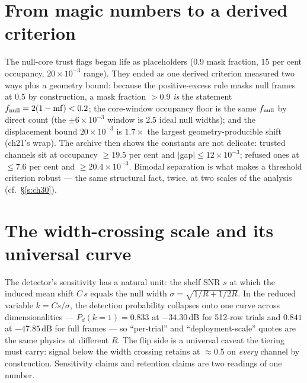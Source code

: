 \documentclass[10pt]{article}
\begin{document}
\section{From magic numbers to a derived criterion}
The null-core trust flags began life as placeholders (0.9 mask
fraction, 15 per cent occupancy, $20\times10^{-3}$ range). They ended
as one derived criterion measured two ways plus a geometry bound:
because the positive-excess rule masks null frames at 0.5 by
construction, a mask fraction $>0.9$ \emph{is} the statement
$f_{\rm null} = 2(1-\mathrm{mf}) < 0.2$; the core-window occupancy
floor is the same $f_{\rm null}$ by direct count (the
$\pm 6\times10^{-3}$ window is 2.5 ideal null widths); and the
displacement bound $20\times10^{-3}$ is $1.7\times$ the largest
geometry-producible shift (ch21's wrap). The archive then shows the
constants are not delicate: trusted channels sit at occupancy
$\ge 19.5$ per cent and $|$gap$| \le 12\times10^{-3}$; refused ones at
$\le 7.6$ per cent and $\ge 20.4\times10^{-3}$. Bimodal separation is
what makes a threshold criterion robust --- the same structural fact,
twice, at two scales of the analysis (cf.\ \S\ref{s:ch30}).

\section{The width-crossing scale and its universal curve}
The detector's sensitivity has a natural unit: the shelf SNR $s$ at
which the induced mean shift $C\,s$ equals the null width
$\sigma = \sqrt{1/R + 1/2R}$. In the reduced variable
$k = C s/\sigma$, the detection probability collapses onto one curve
across dimensionalities --- $P_d(k{=}1) = 0.833$ at $-34.30$\,dB for
512-row trials and $0.841$ at $-47.85$\,dB for full frames ---
so ``per-trial'' and ``deployment-scale'' quotes are the same physics
at different $R$. The flip side is a universal caveat the tiering
must carry: signal below the width crossing retains at $\approx$0.5 on
\emph{every} channel by construction. Sensitivity claims and
retention claims are two readings of one number.
\end{document}
